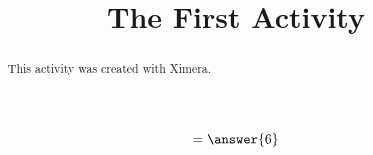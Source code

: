 \documentclass{ximera}
\title{The First Activity}
\begin{document}
  
\begin{abstract}  
This activity was created with Ximera.
\end{abstract}  
\maketitle

\begin{problem}
  \begin{prompt}
      \[
      = \answer{6}
      \]
  \end{prompt} 
  
\end{problem}
\end{document}
